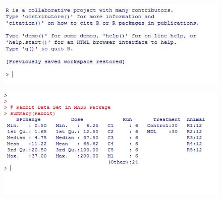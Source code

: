 \documentclass{beamer}
\begin{document}
 	
 	\begin{frame}
 		\begin{figure}
 			\centering
 			\includegraphics[width=0.7\linewidth]{images/Rhelpcommands}
 		\end{figure}
 	\end{frame}   
 	
 	\begin{frame}
 		\begin{figure}
 			\centering
 			\includegraphics[width=0.7\linewidth]{images/rabbitsummary}   
 		\end{figure}
 	\end{frame} 
 	
\end{document}
